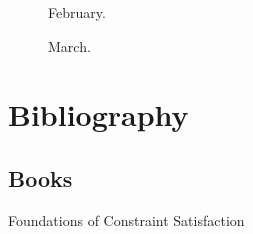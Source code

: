 \documentclass[]{final_report}
\begin{document}
\begin{figure}[h]
	\centering
	\fboxsep 2mm
	\caption{\label{fig:February} February.}
\end{figure}

\begin{figure}[h]
	\centering
	\fboxsep 2mm
	\caption{\label{fig:March} March.}
\end{figure}

\chapter*{Bibliography}

\section*{Books}

Foundations of Constraint Satisfaction~\cite{TSANG:1993}
\end{document}
